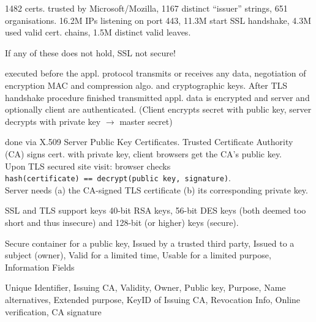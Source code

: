  1482 certs. trusted by Microsoft/Mozilla, 1167 distinct ``issuer'' strings, 651 organisations. 16.2M IPs listening on port 443, 11.3M start SSL handshake, 4.3M used valid cert. chains, 1.5M distinct valid leaves.

If any of these does not hold, SSL not secure!

 executed before the appl. protocol transmits or receives any data, negotiation of encryption MAC and compression algo. and cryptographic keys. After TLS handshake procedure finished transmitted appl. data is encrypted and server and optionally client are authenticated. (Client encrypts secret with public key, server decrypts with private key $\to$ master secret)

 done via X.509 Server Public Key Certificates. Trusted Certificate Authority (CA) signs cert. with private key, client browsers get the CA's public key.\\
Upon TLS secured site visit: browser checks\\ {\tt hash(certificate) == decrypt(public key, signature)}.\\
Server needs (a) the CA-signed TLS certificate (b) its corresponding private key.

 SSL and TLS support keys 40-bit RSA keys, 56-bit DES keys (both deemed too short and thus insecure) and 128-bit (or higher) keys (secure).

 Secure container for a public key,
Issued by a trusted third party,
Issued to a subject (owner),
Valid for a limited time,
Usable for a limited purpose,
Information Fields

 Unique Identifier, Issuing CA, Validity, Owner, Public key, Purpose, Name alternatives, Extended purpose, KeyID of Issuing CA, Revocation Info, Online verification, CA signature

